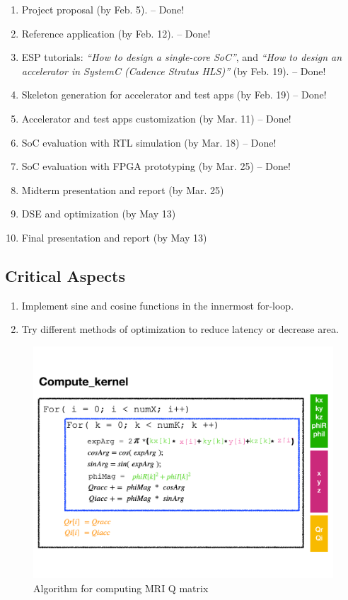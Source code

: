 \begin{enumerate}

\item Project proposal (by Feb. 5). -- Done!

\item Reference application (by Feb. 12). -- Done!

\item ESP tutorials: \emph{``How to design a single-core SoC''}, and \emph{``How
  to design an accelerator in SystemC (Cadence Stratus HLS)''} (by Feb. 19). -- Done!

\item Skeleton generation for accelerator and test apps (by Feb. 19) -- Done!

\item Accelerator and test apps customization (by Mar. 11) -- Done!
 
\item SoC evaluation with RTL simulation (by Mar. 18) -- Done!

\item SoC evaluation with FPGA prototyping (by Mar. 25) -- Done!

\item Midterm presentation and report (by Mar. 25)

\item DSE and optimization (by May 13)

\item Final presentation and report (by May 13)

\end{enumerate}

\subsection{Critical Aspects}
\begin{enumerate}
\setlength\itemsep{-0.15em}
\item Implement sine and cosine functions in the innermost for-loop.
\item Try different methods of optimization to reduce latency or decrease area.
\end{enumerate}

\begin{figure}[t]
\centering
\captionsetup{justification=centering, format=hang}
\includegraphics[width=0.85\columnwidth]{figures/algorithm}
\caption{Algorithm for computing MRI Q matrix~\cite{stone2008accelerating}}
\label{fig-1}
\end{figure}

